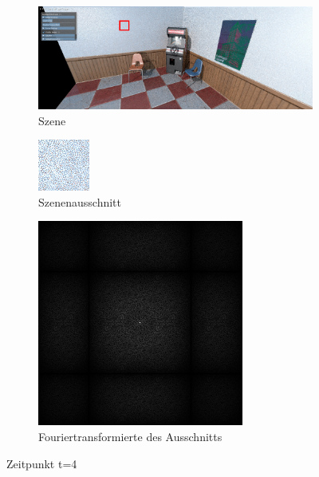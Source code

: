 \begin{figure}[H]
    \begin{subfigure}{\textwidth}  
        \centering \includegraphics[scale=.2]{content/TemporalerAlg/Bilder/Screenshotreihe/frame_t_4.0.png}
        \caption{Szene}
        \label{fig:Szene_t1}
    \end{subfigure}
    \begin{subfigure}{0.5\textwidth}
        \centering\includegraphics[width=0.5\linewidth]{content/TemporalerAlg/Bilder/Screenshotreihe/frame_t_4.0_64x64.png} 
        \caption{Szenenausschnitt}
        \label{fig:ausschnitt_t4}
    \end{subfigure}
    \begin{subfigure}{0.5\textwidth}
        \centering\includegraphics[width=0.5\linewidth]{content/TemporalerAlg/Bilder/Screenshotreihe/spektrum/frame_t_4.0_64x64_fourier.png}
        \caption{Fouriertransformierte des Ausschnitts}
        \label{fig:Fouriertransformierte_t4}
    \end{subfigure}
        \caption{Zeitpunkt t=4}
        \label{fig:Verlauf_t4}
\end{figure}

